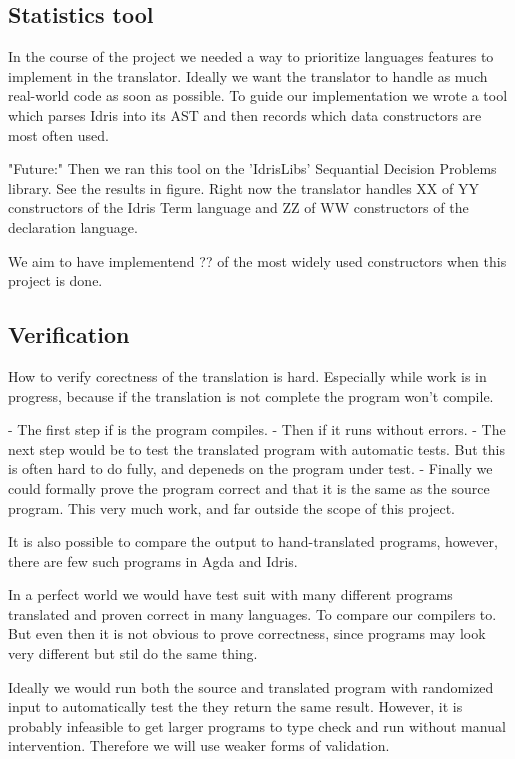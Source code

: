 \documentclass[parskip=half]{scrartcl}
\begin{document}
\subsection{Statistics tool}
In the course of the project we needed a way to prioritize languages features
to implement in the translator. Ideally we want the translator to handle
as much real-world code as soon as possible. To guide our implementation we
wrote a tool which parses Idris into its AST and then records which data
constructors are most often used.

"Future:" Then we ran this tool on the 'IdrisLibs' Sequantial Decision
Problems library. See the results in figure. Right now the translator handles
XX of YY constructors of the Idris Term language and ZZ of WW constructors of
the declaration language.

We aim to have implementend ?? of the most widely used constructors when this
project is done.


\subsection{Verification}
How to verify corectness of the translation is hard. Especially while work is
in progress, because if the translation is not complete the program won't
compile.

- The first step if is the program compiles.
- Then if it runs without errors.
- The next step would be to test the translated program with automatic tests.
  But this is often hard to do fully, and depeneds on the program under test.
- Finally we could formally prove the program correct and that it is the same
  as the source program. This very much work, and far outside the scope of this
  project.

It is also possible to compare the output to hand-translated programs, however,
there are few such programs in Agda and Idris.

In a perfect world we would have test suit with many different programs
translated and proven correct in many languages. To compare our compilers to.
But even then it is not obvious to prove correctness, since programs may look
very different but stil do the same thing.

Ideally we would run both the source and translated program with randomized
input to automatically test the they return the same result. However, it is
probably infeasible to get larger programs to type check and run without manual
intervention.  Therefore we will use weaker forms of validation.
\end{document}

